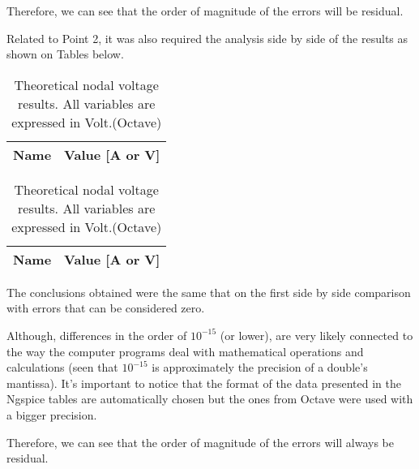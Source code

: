 Therefore, we can see that the order of magnitude of the errors will be residual.

\pagebreak Related to Point 2, it was also required the analysis side by side of the results as shown on Tables below. 

\begin{table}[ht]
\parbox{.45\linewidth}{
  \centering
  \begin{tabular}{|l|r|}
    \hline    
    {\bf Name} & {\bf Value [A or V]} \\ \hline
    
 
  \end{tabular}
  \caption{Simulation nodal voltage results. All variables are expressed in Volt or Ampere. (Ngspice)}} 
\parbox{.45\linewidth}{
  \centering
  \begin{tabular}{|l|r|}
    \hline    
    {\bf Name} & {\bf Value [A or V]} \\ \hline
    
    
  \end{tabular}
  \caption{Theoretical nodal voltage results. All variables are expressed in Volt.(Octave)}}
\label{tab:final2} 
\end{table}

The conclusions obtained were the same that on the first side by side comparison with errors that can be considered zero.

Although, differences in the order of $10^{-15}$ (or lower), are very likely connected to the way the computer programs deal with mathematical operations and calculations (seen that $10^{-15}$ is approximately the precision of a double's mantissa). It's important to notice that the format of the data presented in the Ngspice tables are automatically chosen but the ones from Octave were used with a bigger precision.

Therefore, we can see that the order of magnitude of the errors will always be residual.




